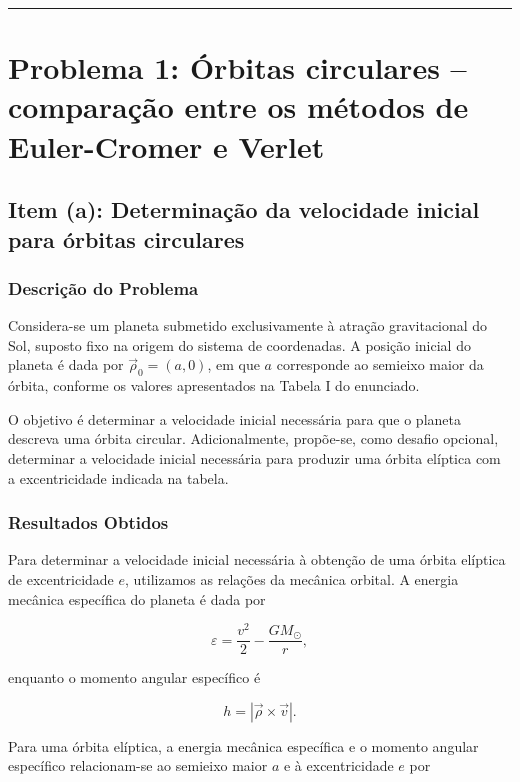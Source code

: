 \documentclass[12pt,a4paper]{article}
\begin{document}
\vspace{0.5cm}
\hrule
\vspace{0.5cm}

\section{Problema 1: Órbitas circulares -- comparação entre os métodos de Euler-Cromer e Verlet}

\subsection{Item (a): Determinação da velocidade inicial para órbitas circulares}

\subsubsection{Descrição do Problema}

Considera-se um planeta submetido exclusivamente à atração gravitacional do Sol, suposto fixo na origem do sistema de coordenadas. A posição inicial do planeta é dada por $\vec{\rho}_0=(a,0)$, em que $a$ corresponde ao semieixo maior da órbita, conforme os valores apresentados na Tabela I do enunciado.

O objetivo é determinar a velocidade inicial necessária para que o planeta descreva uma órbita circular. Adicionalmente, propõe-se, como desafio opcional, determinar a velocidade inicial necessária para produzir uma órbita elíptica com a excentricidade indicada na tabela.

\subsubsection{Resultados Obtidos}

Para determinar a velocidade inicial necessária à obtenção de uma órbita
elíptica de excentricidade $e$, utilizamos as relações da mecânica orbital.
A energia mecânica específica do planeta é dada por

\begin{equation}
    \varepsilon = \frac{v^2}{2} - \frac{GM_{\odot}}{r},
\end{equation}

enquanto o momento angular específico é

\begin{equation}
    h = |\vec{\rho} \times \vec{v}|.
\end{equation}

Para uma órbita elíptica, a energia mecânica específica e o momento angular
específico relacionam-se ao semieixo maior $a$ e à excentricidade $e$ por
\end{document}
